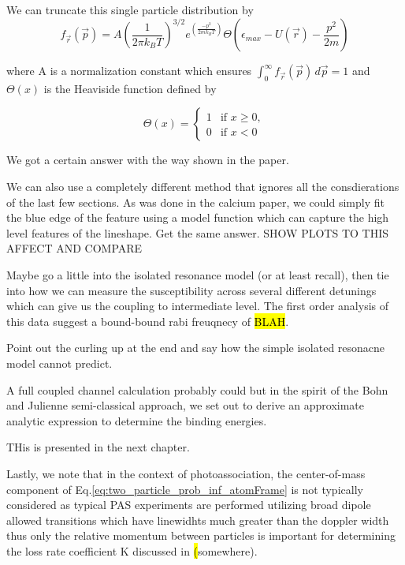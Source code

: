\noindent
We can truncate this single particle distribution by 
\begin{equation}
\label{eq:trun_single_particle_prob}
		 f_{ \vec{r} }( \vec{p} ) = A \left(\frac{1}{2 \pi k_B T}\right)^{3/2} e^{\left(\frac{-p^2}{2 m k_B T}\right)} \Theta \left( \epsilon_{max} - U( \vec{r} ) - \frac{p^2}{2 m} \right)
\end{equation}

\noindent
where A is a normalization constant which ensures $\int_0^\infty f_{ \vec{r} }( \vec{p} )\,d \vec{p} = 1 $ and $\Theta(x)$ is the Heaviside function defined by

\begin{equation}
\label{eq:heaviside}
	\Theta(x)=
	\begin{cases}
		1 &\text{if } x \geq 0, \\
		0 &\text{if } x < 0
	\end{cases}
\end{equation}

We got a certain answer with the way shown in the paper.

We can also use a completely different method that ignores all the consdierations of the last few sections. As was done in the calcium paper, we could simply fit the blue edge of the feature using a model function which can capture the high level features of the lineshape. Get the same answer. SHOW PLOTS TO THIS AFFECT AND COMPARE

Maybe go a little into the isolated resonance model (or at least recall), then tie into how we can measure the susceptibility across several different detunings which can give us the coupling to intermediate level. The first order analysis of this data suggest a bound-bound rabi freuqnecy of \hl{BLAH}. 

Point out the curling up at the end and say how the simple isolated resonacne model cannot predict.

A full coupled channel calculation probably could but in the spirit of the Bohn and Julienne semi-classical approach, we set out to derive an approximate analytic expression to determine the binding energies.

THis is presented in the next chapter.

Lastly, we note that in the context of photoassociation, the center-of-mass component of Eq.\ref{eq:two_particle_prob_inf_atomFrame} is not typically considered as typical PAS experiments are performed utilizing broad dipole allowed transitions which have linewidhts much greater than the doppler width thus only the relative momentum between particles is important for determining the loss rate coefficient K discussed in \hl(somewhere). 

